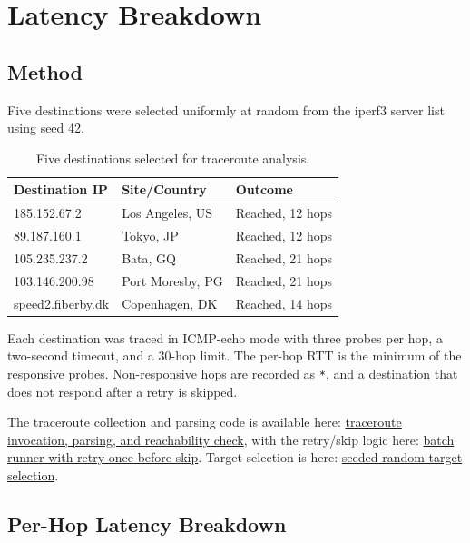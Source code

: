 \documentclass[11pt]{article}
\newcommand{\repolink}{https://github.com/RohMalpani/CS422Assignments}
\newcommand{\codelink}[2]{\href{\repolink/blob/main/#2}{#1}}
\begin{document}
\section{Latency Breakdown}

\subsection{Method}

Five destinations were selected uniformly at random from the iperf3 server
list using seed 42.

\begin{table}[H]
    \centering
    \caption{Five destinations selected for traceroute analysis.}
    \label{tab:traceroute-destinations}
    \begin{tabular}{lll}
        \toprule
        Destination IP & Site/Country & Outcome \\
        \midrule
        185.152.67.2 & Los Angeles, US & Reached, 12 hops \\
        89.187.160.1 & Tokyo, JP & Reached, 12 hops \\
        105.235.237.2 & Bata, GQ & Reached, 21 hops \\
        103.146.200.98 & Port Moresby, PG & Reached, 21 hops \\
        speed2.fiberby.dk & Copenhagen, DK & Reached, 14 hops \\
        \bottomrule
    \end{tabular}
\end{table}

Each destination was traced in ICMP-echo mode with three probes per hop, a
two-second timeout, and a 30-hop limit. The per-hop RTT is the minimum of the
responsive probes. Non-responsive hops are recorded as \texttt{*}, and a
destination that does not respond after a retry is skipped.

The traceroute collection and parsing code is available here:
\codelink{traceroute invocation, parsing, and reachability check}{assignment1/part2/traceroute\_runner.py\#L47-L153},
with the retry/skip logic here:
\codelink{batch runner with retry-once-before-skip}{assignment1/part2/batch\_traceroute.py\#L21-L37}.
Target selection is here:
\codelink{seeded random target selection}{assignment1/part2/select\_targets.py\#L1-L76}.

\subsection{Per-Hop Latency Breakdown}
\end{document}
